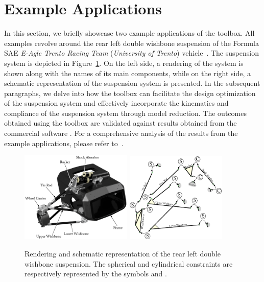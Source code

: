 
\section{Example Applications}
\label{app4:sec:example_applications}

In this section, we briefly showcase two example applications of the \TrussMe{} toolbox. All examples revolve around the rear left double wishbone suspension of the Formula SAE \emph{E-Agle Trento Racing Team} (\emph{University of Trento}) vehicle~\citep{eagle}. The suspension system is depicted in Figure~\ref{app4:fig:suspension}. On the left side, a rendering of the system is shown along with the names of its main components, while on the right side, a schematic representation of the suspension system is presented. In the subsequent paragraphs, we delve into how the \TrussMe{} toolbox can facilitate the design optimization of the suspension system and effectively incorporate the kinematics and compliance of the suspension system through model reduction. The outcomes obtained using the \TrussMe{} toolbox are validated against results obtained from the commercial software \Ansys{}. For a comprehensive analysis of the results from the example applications, please refer to~\cite{larcher2024imece_symbolic}.

\begin{figure}[htb]
  \centering
  \includegraphics[width=0.475\textwidth, trim={2cm 2cm 3.5cm 2cm}, clip]{./figures/appendix_4/rendering.eps}
  \includegraphics[width=0.425\textwidth]{./figures/appendix_4/constraints.eps}
  \caption{Rendering and schematic representation of the rear left double wishbone suspension. The spherical and cylindrical constraints are respectively represented by the symbols  and .}
  \label{app4:fig:suspension}
\end{figure}

